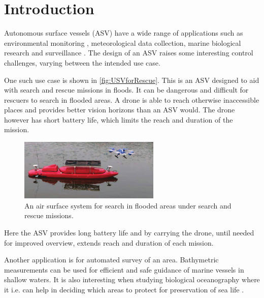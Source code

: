 \chapter{Introduction}

Autonomous surface vessels (ASV) have a wide range of applications such as environmental monitoring \cite[p. 745]{MAHsieh}, meteorological data collection, marine biological research and surveillance \cite[p. 8-10]{FFahimi}.
The design of an ASV raises some interesting control challenges, varying between the intended use case.

One such use case is shown in \autoref{fig:USVforRescue}. 
This is an ASV designed to aid with search and rescue missions in floods. 
It can be dangerous and difficult for rescuers to search in flooded areas. 
A drone is able to reach otherwise inaccessible places and provides better vision horizons than an ASV would. 
The drone however has short battery life, which limits the reach and duration of the mission.
%
\begin{figure}[H]
  \vspace{3mm}
  \includegraphics[width=0.6\textwidth]{figures/USVforRescue.pdf}
  \caption{An air surface system for search in flooded areas under search and rescue missions. \cite{JZhang}}
  \label{fig:USVforRescue}
\end{figure}
%
Here the ASV provides long battery life and by carrying the drone, until needed for improved overview, extends reach and duration of each mission. \cite{JZhang}



Another application is for automated survey of an area.
Bathymetric measurements can be used for efficient and safe guidance of marine vessels in shallow waters. 
It is also interesting when studying biological oceanography where it i.e. can help in deciding which areas to protect for preservation of sea life \cite{NOService}. 


